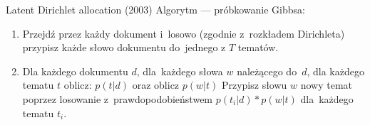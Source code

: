 \documentclass{beamer}
\begin{document}
	\begin{frame}{Latent Dirichlet allocation (2003)}
		Algorytm --- próbkowanie Gibbsa:\\
		\begin{enumerate}
			\setlength\itemsep{2em}
			\item Przejdź przez każdy dokument i~losowo (zgodnie z~rozkładem Dirichleta) przypisz każde słowo dokumentu do~jednego z $T$ tematów.
			
			\item Dla każdego dokumentu $d$, dla~każdego słowa $w$ należącego do~$d$, dla każdego tematu $t$ oblicz: $p(t | d)$
			oraz oblicz $p(w | t)$
			Przypisz słowu $w$ nowy temat poprzez losowanie z~prawdopodobieństwem $p(t_i|d)*p(w|t)$ dla~każdego tematu $t_i$.
		\end{enumerate}
		
	\end{frame}
\end{document}
